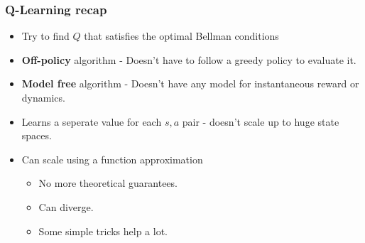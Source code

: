 \documentclass[handout]{beamer}
\renewcommand{\high}{\textbf}
\begin{document}
\begin{frame}\frametitle{Q-Learning recap}\small

\begin{itemize}
	\item Try to find $Q$ that satisfies the optimal Bellman conditions
	\onslide<2->\item \high{Off-policy} algorithm - Doesn't have to follow a greedy policy to evaluate it.
	\onslide<3->\item \high{Model free} algorithm - Doesn't have any model for instantaneous reward or dynamics.
	\onslide<4->\item Learns a seperate value for each $s,a$ pair - doesn't scale up to huge state spaces.
	\onslide<5->\item Can scale using a function approximation
	\begin{itemize}
		\item No more theoretical guarantees.
		\item Can diverge. 
		\item Some simple tricks help a lot.
	\end{itemize}
	
	
\end{itemize}

\end{frame}
\end{document}
